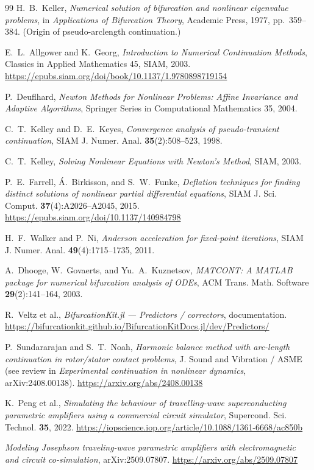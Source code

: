 \documentclass[11pt]{article}
\begin{document}
\begin{thebibliography}{99}
 H.~B.~Keller,
  \emph{Numerical solution of bifurcation and nonlinear eigenvalue problems},
  in \textit{Applications of Bifurcation Theory}, Academic Press, 1977,
  pp.~359--384. (Origin of pseudo-arclength continuation.)

 E.~L.~Allgower and K.~Georg,
  \emph{Introduction to Numerical Continuation Methods}, Classics in Applied
  Mathematics 45, SIAM, 2003.
  \url{https://epubs.siam.org/doi/book/10.1137/1.9780898719154}

 P.~Deuflhard,
  \emph{Newton Methods for Nonlinear Problems: Affine Invariance and Adaptive
  Algorithms}, Springer Series in Computational Mathematics 35, 2004.

 C.~T.~Kelley and D.~E.~Keyes,
  \emph{Convergence analysis of pseudo-transient continuation},
  SIAM J. Numer. Anal. \textbf{35}(2):508--523, 1998.

 C.~T.~Kelley,
  \emph{Solving Nonlinear Equations with Newton's Method}, SIAM, 2003.

 P.~E.~Farrell, {\'A}.~Birkisson, and
  S.~W.~Funke, \emph{Deflation techniques for finding distinct solutions of
  nonlinear partial differential equations}, SIAM J. Sci. Comput.
  \textbf{37}(4):A2026--A2045, 2015.
  \url{https://epubs.siam.org/doi/10.1137/140984798}

 H.~F.~Walker and P.~Ni,
  \emph{Anderson acceleration for fixed-point iterations},
  SIAM J. Numer. Anal. \textbf{49}(4):1715--1735, 2011.

 A.~Dhooge, W.~Govaerts, and Yu.~A.~Kuznetsov,
  \emph{MATCONT: A MATLAB package for numerical bifurcation analysis of ODEs},
  ACM Trans. Math. Software \textbf{29}(2):141--164, 2003.

 R.~Veltz et al.,
  \emph{BifurcationKit.jl --- Predictors / correctors}, documentation.
  \url{https://bifurcationkit.github.io/BifurcationKitDocs.jl/dev/Predictors/}

 P.~Sundararajan and S.~T.~Noah,
  \emph{Harmonic balance method with arc-length continuation in rotor/stator
  contact problems}, J. Sound and Vibration / ASME (see review in
  \textit{Experimental continuation in nonlinear dynamics}, arXiv:2408.00138).
  \url{https://arxiv.org/abs/2408.00138}

 K.~Peng et al.,
  \emph{Simulating the behaviour of travelling-wave superconducting parametric
  amplifiers using a commercial circuit simulator}, Supercond. Sci. Technol.
  \textbf{35}, 2022.
  \url{https://iopscience.iop.org/article/10.1088/1361-6668/ac850b}

  \emph{Modeling Josephson traveling-wave parametric amplifiers with
  electromagnetic and circuit co-simulation}, arXiv:2509.07807.
  \url{https://arxiv.org/abs/2509.07807}
\end{thebibliography}
\end{document}
